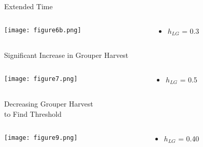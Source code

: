 \documentclass{beamer}
\begin{document}
\begin{frame}{Extended Time}
\begin{columns}[t]
\begin{column}[T]{8cm}
\texttt{[image: figure6b.png]}
\end{column}
\begin{column}[T]{3cm}
\begin{itemize}

\item $h_{LG}$ = 0.3



\end{itemize}
\end{column}
\end{columns}
\end{frame}

\begin{frame}{Significant Increase in Grouper Harvest}
\begin{columns}[t]
\begin{column}[T]{8cm}
\texttt{[image: figure7.png]}
\end{column}
\begin{column}[T]{3cm}
\begin{itemize}

\item $h_{LG}$ = 0.5



\end{itemize}
\end{column}
\end{columns}
\end{frame}


\begin{frame}{Decreasing Grouper Harvest\\ to Find Threshold}
\begin{columns}[t]
\begin{column}[T]{8cm}
\texttt{[image: figure9.png]}
\end{column}
\begin{column}[T]{3cm}
\begin{itemize}

\item $h_{LG}$ = 0.40



\end{itemize}
\end{column}
\end{columns}
\end{frame}
\end{document}
